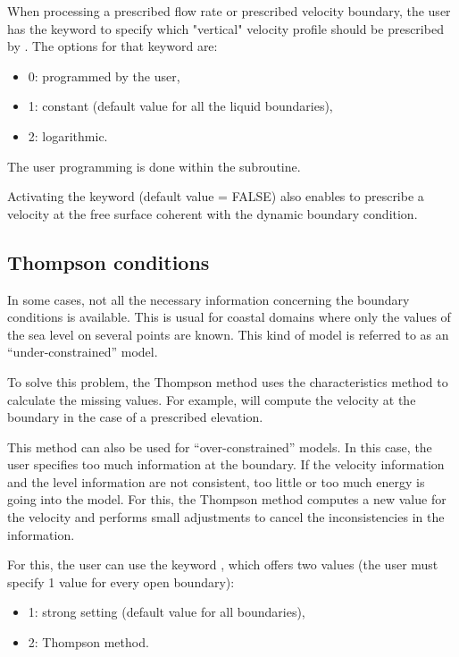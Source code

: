 When processing a prescribed flow rate or prescribed velocity boundary, the
user has the keyword  to specify which
"vertical" velocity profile should be prescribed by . The options for
that keyword are:

\begin{itemize}
\item 0: programmed by the user,

\item 1: constant (default value for all the liquid boundaries),

\item 2: logarithmic.
\end{itemize}

The user programming is done within the  subroutine.

Activating the keyword  (default value =
FALSE) also enables to prescribe a velocity at the free surface coherent with
the dynamic boundary condition.

\subsection{Thompson conditions}

In some cases, not all the necessary information concerning the boundary
conditions is available. This is usual for coastal domains where only the
values of the sea level on several points are known. This kind of model is
referred to as an ``under-constrained'' model.

To solve this problem, the Thompson method uses the characteristics method to
calculate the missing values. For example,  will compute the velocity
at the boundary in the case of a prescribed elevation.

This method can also be used for ``over-constrained'' models. In this case,
the user specifies too much information at the boundary. If the velocity
information and the level information are not consistent, too little or too
much energy is going into the model. For this, the Thompson method computes a
new value for the velocity and performs small adjustments to cancel the
inconsistencies in the information.

For this, the user can use the keyword ,
which offers two values (the user must specify 1 value for every open
boundary):

\begin{itemize}
\item 1: strong setting (default value for all boundaries),

\item 2: Thompson method.
\end{itemize}

